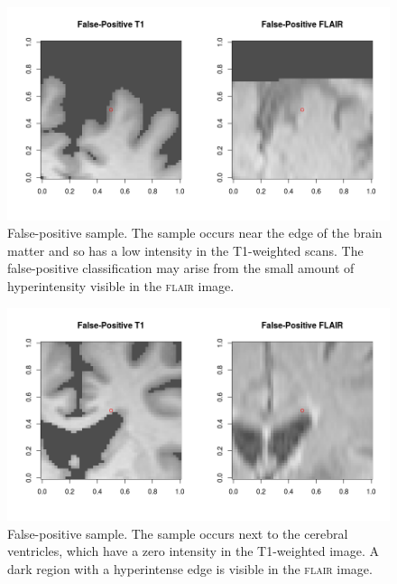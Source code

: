 \begin{figure}[ht]
\centering
\includegraphics[width=\linewidth]{Images/7_FP_t1_flair.png}
\caption{\small{False-positive sample. The sample occurs near the edge of the brain matter and so has a low intensity in the T1-weighted scans. The false-positive classification may arise from the small amount of hyperintensity visible in the \textsc{flair} image.}}
\label{results-fp1}
\end{figure}

\begin{figure}[ht]
\centering
\includegraphics[width=\linewidth]{Images/7_FP_t1_flair2.png}
\caption{\small{False-positive sample. The sample occurs next to the cerebral ventricles, which have a zero intensity in the T1-weighted image. A dark region with a hyperintense edge is visible in the \textsc{flair} image.}}
\label{results-fp2}
\end{figure}

